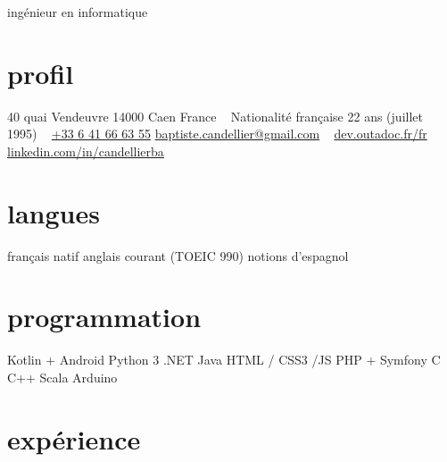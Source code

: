 \documentclass[]{friggeri-cv}
\begin{document}
{ingénieur en informatique}

\begin{aside}
    \section{profil}
    40 quai Vendeuvre
    14000 Caen
    France
    ~
    Nationalité française
    22 ans (juillet 1995)
    ~
    \href{tel:0033641666355}{+33 6 41 66 63 55}
    \href{mailto:baptiste.candellier@gmail.com}{baptiste.candellier@gmail.com}
    ~
    {\NoAutoSpacing\href{https://dev.outadoc.fr/fr}{dev.outadoc.fr/fr}}
    {\NoAutoSpacing\href{https://www.linkedin.com/in/candellierba/}{linkedin.com/in/candellierba}}
    \section{langues}
    français natif
    anglais courant (TOEIC 990)
    notions d'espagnol
    \section{programmation}
    Kotlin + Android 
    Python 3 
    \csharp{} .NET 
    Java 
    HTML / CSS3 /JS 
    PHP + Symfony 
    C 
    C++ 
    Scala 
    Arduino 
    \restorecr 
    \obeycr
\end{aside}

\section{expérience}
\end{document}
